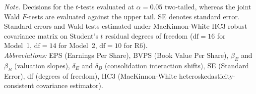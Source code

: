 \begin{table}[!htbp]
\vspace{4pt}
\begin{minipage}{\linewidth}
\footnotesize
\textit{Note.} Decisions for the $t$-tests evaluated at $\alpha = 0.05$ two-tailed, whereas the joint Wald $F$-tests are evaluated against the upper tail. SE denotes standard error. Standard errors and Wald tests estimated under MacKinnon-White HC3 robust covariance matrix on Student's $t$ residual degrees of freedom ($\text{df} = 16$ for Model~1, $\text{df} = 14$ for Model~2, $\text{df} = 10$ for R6). \\
\textit{Abbreviations:} EPS (Earnings Per Share), BVPS (Book Value Per Share), $\beta_E$ and $\beta_B$ (valuation slopes), $\delta_E$ and $\delta_B$ (consolidation interaction shifts), SE (Standard Error), df (degrees of freedom), HC3 (MacKinnon-White heteroskedasticity-consistent covariance estimator).
\end{minipage}
\end{table}

